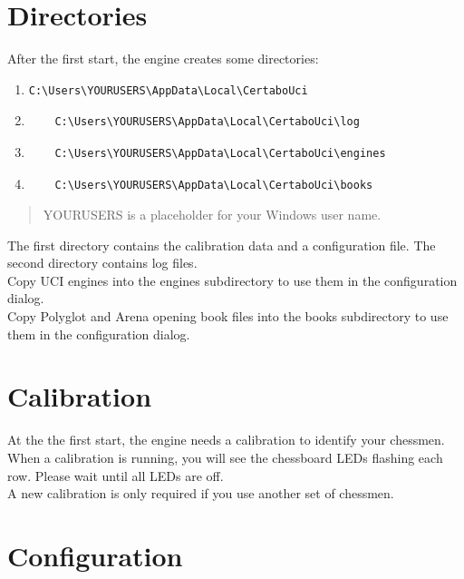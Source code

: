 \documentclass[11pt,a4paper]{article}
\begin{document}
\section{Directories}
After the first start, the engine creates some directories:
\begin{enumerate}
	\item \begin{verbatim}
C:\Users\YOURUSERS\AppData\Local\CertaboUci
	\end{verbatim} 
	\item\begin{verbatim}
	C:\Users\YOURUSERS\AppData\Local\CertaboUci\log
	\end{verbatim} 
	\item \begin{verbatim}
	C:\Users\YOURUSERS\AppData\Local\CertaboUci\engines
	\end{verbatim} 	
		\item \begin{verbatim}
	C:\Users\YOURUSERS\AppData\Local\CertaboUci\books
	\end{verbatim} 	
\end{enumerate}
\begin{quote}
YOURUSERS is a placeholder for your Windows user name.
\end{quote}

The first directory contains the calibration data and a configuration file. The second directory contains log files.\\Copy UCI engines into the engines subdirectory to use them in the configuration dialog.\\Copy Polyglot and Arena opening book files into the books subdirectory to use them in the configuration dialog.

\section{Calibration}
At the the first start, the engine needs a calibration to identify your chessmen. When a calibration is running, you will see the chessboard LEDs flashing each row. Please wait until all LEDs are off.\\A new calibration is only required if you use another set of chessmen.

\section{Configuration}
\end{document}
